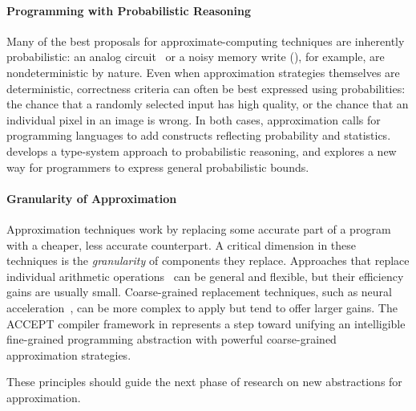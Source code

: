 \paragraph{Programming with Probabilistic Reasoning}
Many of the best proposals for approximate-computing techniques are inherently
probabilistic:
an analog circuit~\cite{anpu} or a noisy memory write (),
for example, are nondeterministic by nature.
Even when approximation strategies themselves are deterministic, correctness
criteria can often be best expressed using probabilities: the chance that a
randomly selected input has high quality, or the chance that an individual
pixel in an image is wrong.
In both cases, approximation calls for programming languages to add constructs
reflecting probability and statistics.
 develops a type-system approach to probabilistic reasoning,
and  explores a new way for programmers to express
general probabilistic bounds.

\paragraph{Granularity of Approximation}
Approximation techniques work by replacing some accurate part of a program
with a cheaper, less accurate counterpart.
A critical dimension in these techniques is the \emph{granularity} of
components they replace.
Approaches that replace individual arithmetic operations~\cite{truffle} can be
general and flexible, but their efficiency gains are usually small.
Coarse-grained replacement techniques, such as neural acceleration~\cite{npu},
can be more complex to apply
but tend to offer larger gains.
The ACCEPT compiler framework in  represents a step toward
unifying an intelligible fine-grained programming abstraction
with powerful coarse-grained approximation strategies.

These principles should guide the next phase of research on new abstractions
for approximation.
